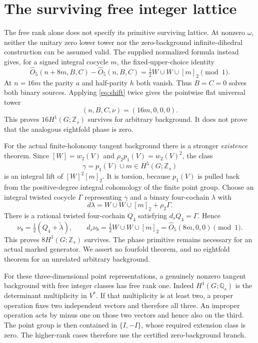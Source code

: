 \documentclass[11pt]{article}
\newcommand{\Z}{\mathbb Z}
\newcommand{\Q}{\mathbb Q}
\newcommand{\lift}[1]{\widetilde{#1}}
\newcommand{\ds}{d_s}
\newcommand{\OO}{\widehat O}
\begin{document}
\section{The surviving free integer lattice}
The free rank alone does not specify its primitive surviving lattice.
At nonzero $\omega$, neither the unitary zero lower tower nor the
zero-background infinite-dihedral construction can be assumed valid.
The supplied normalized formula instead gives, for a signed integral
cocycle $m$, the fixed-upper-choice identity
\begin{equation}\label{eq:shift}
 \OO_5(n+8m,B,C)-\OO_5(n,B,C)
        =\tfrac12 W\cup W\cup[m]_2\pmod1.
\end{equation}
At $n=16m$ the parity $a$ and half-parity $h$ both vanish. Thus
$B=C=0$ solves both binary sources. Applying \eqref{eq:shift} twice
gives the pointwise flat universal tower
\begin{equation}\label{eq:16}
 (n,B,C,\nu)=(16m,0,0,0).
\end{equation}
This proves $16H^1(G;\Z_s)$ survives for arbitrary background.
It does not prove that the analogous eightfold phase is zero.

For the actual finite-holonomy tangent background there is a stronger
\emph{existence} theorem. Since $[W]=w_2(V)$ and
$\rho_2p_1(V)=w_2(V)^2$, the class
\begin{equation}
 \gamma=p_1(V)\cup m\in H^5(G;\Z_s)
\end{equation}
is an integral lift of $[W]^2[m]_2$. It is torsion, because $p_1(V)$
is pulled back from the positive-degree integral cohomology of the
finite point group. Choose an integral twisted cocycle $\Gamma$
representing $\gamma$ and a binary four-cochain $\lambda$ with
\begin{equation}
 d\lambda=W\cup W\cup[m]_2+\rho_2\Gamma.
\end{equation}
There is a rational twisted four-cochain $Q_4$ satisfying
$\ds Q_4=\Gamma$. Hence
\begin{equation}
 \nu_8=\tfrac12(Q_4+\lift\lambda),\qquad
 \ds\nu_8=\tfrac12 W\cup W\cup[m]_2
              =\OO_5(8m,0,0)\pmod1.
\end{equation}
This proves $8H^1(G;\Z_s)$ survives. The phase primitive remains
necessary for an actual marked generator. We assert no fourfold
theorem, and no eightfold theorem for an unrelated arbitrary background.

For these three-dimensional point representations, a genuinely nonzero
tangent background with free integer classes has free rank one.
Indeed $H^1(G;\Q_s)$ is the determinant multiplicity in $V^*$.
If that multiplicity is at least two, a proper operation fixes two
independent vectors and therefore all three. An improper operation
acts by minus one on those two vectors and hence also on the third.
The point group is then contained in $\{I,-I\}$, whose required
extension class is zero. The higher-rank cases therefore use the
certified zero-background branch.
\end{document}
